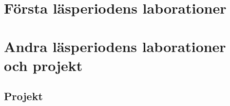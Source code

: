 \documentclass[a4paper]{compendium}
\begin{document}
\part{Första läsperiodens laborationer}


%


%
%

\setcounter{chapter}{2}

%


%


%


%


%




\part{Andra läsperiodens laborationer och projekt}


%


%


%


%


%
%

\chapter{Projekt}
\end{document}
